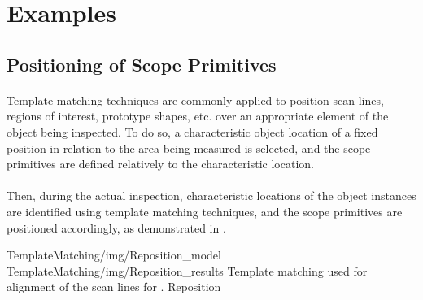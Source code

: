 \section{Examples}

\subsection{Positioning of Scope Primitives}

\paragraph*{}
Template matching techniques are commonly applied to position scan lines, regions of interest, prototype shapes, etc. over an appropriate element of the object being inspected. To do so, a characteristic object location of a fixed position in relation to the area being measured is selected, and the scope primitives are defined relatively to the characteristic location.

\paragraph*{}
Then, during the actual inspection, characteristic locations of the object instances are identified using template matching techniques, and the scope primitives are positioned accordingly, as demonstrated in .

\twoFigures
{TemplateMatching/img/Reposition_model}
{TemplateMatching/img/Reposition_results}
{Template matching used for alignment of the scan lines for .}
{Reposition}
{\basicWidth}
